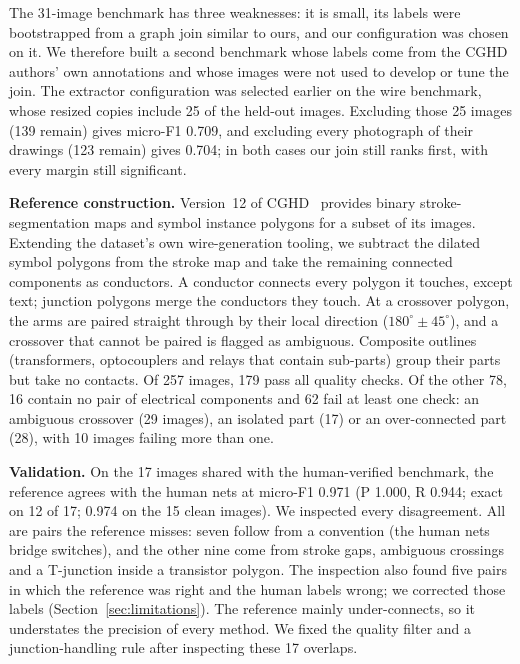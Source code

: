 \documentclass[journal]{IEEEtran}
\begin{document}
The 31-image benchmark has three weaknesses: it is small, its labels were bootstrapped from a graph join similar to ours, and our configuration was chosen on it. We therefore built a second benchmark whose labels come from the CGHD authors' own annotations and whose images were not used to develop or tune the join. The extractor configuration was selected earlier on the wire benchmark, whose resized copies include 25 of the held-out images. Excluding those 25 images (139 remain) gives micro-F1 0.709, and excluding every photograph of their drawings (123 remain) gives 0.704; in both cases our join still ranks first, with every margin still significant.

\textbf{Reference construction.} Version~12 of CGHD~\cite{cghdv12data} provides binary stroke-segmentation maps and symbol instance polygons for a subset of its images. Extending the dataset's own wire-generation tooling, we subtract the dilated symbol polygons from the stroke map and take the remaining connected components as conductors. A conductor connects every polygon it touches, except text; junction polygons merge the conductors they touch. At a crossover polygon, the arms are paired straight through by their local direction ($180^{\circ}\pm45^{\circ}$), and a crossover that cannot be paired is flagged as ambiguous. Composite outlines (transformers, optocouplers and relays that contain sub-parts) group their parts but take no contacts. Of 257 images, 179 pass all quality checks. Of the other 78, 16 contain no pair of electrical components and 62 fail at least one check: an ambiguous crossover (29 images), an isolated part (17) or an over-connected part (28), with 10 images failing more than one.

\textbf{Validation.} On the 17 images shared with the human-verified benchmark, the reference agrees with the human nets at micro-F1 0.971 (P 1.000, R 0.944; exact on 12 of 17; 0.974 on the 15 clean images). We inspected every disagreement. All are pairs the reference misses: seven follow from a convention (the human nets bridge switches), and the other nine come from stroke gaps, ambiguous crossings and a T-junction inside a transistor polygon. The inspection also found five pairs in which the reference was right and the human labels wrong; we corrected those labels (Section~\ref{sec:limitations}). The reference mainly under-connects, so it understates the precision of every method. We fixed the quality filter and a junction-handling rule after inspecting these 17 overlaps.
\end{document}
